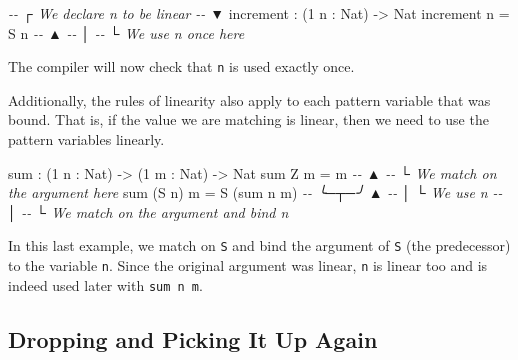 \documentclass[
]{article}
\newenvironment{Shaded}{}{}
\newcommand{\CommentTok}[1]{\textcolor[rgb]{0.38,0.63,0.69}{\textit{#1}}}
\newcommand{\DataTypeTok}[1]{\textcolor[rgb]{0.56,0.13,0.00}{#1}}
\newcommand{\DecValTok}[1]{\textcolor[rgb]{0.25,0.63,0.44}{#1}}
\newcommand{\FunctionTok}[1]{\textcolor[rgb]{0.02,0.16,0.49}{#1}}
\newcommand{\NormalTok}[1]{#1}
\newcommand{\OperatorTok}[1]{\textcolor[rgb]{0.40,0.40,0.40}{#1}}
\newcommand{\OtherTok}[1]{\textcolor[rgb]{0.00,0.44,0.13}{#1}}
\begin{document}
\begin{Shaded}
\begin{Highlighting}[]
\CommentTok{{-}{-}           ┌ We declare \textasciigrave{}n\textasciigrave{} to be linear}
\CommentTok{{-}{-}           ▼}
\NormalTok{increment }\OperatorTok{:}\NormalTok{ (}\DecValTok{1}\NormalTok{ n }\OperatorTok{:} \DataTypeTok{Nat}\NormalTok{) }\OtherTok{{-}\textgreater{}} \DataTypeTok{Nat}
\NormalTok{increment n }\OtherTok{=} \DataTypeTok{S}\NormalTok{ n}
\CommentTok{{-}{-}              ▲}
\CommentTok{{-}{-}              │}
\CommentTok{{-}{-}              └ We use n once here}
\end{Highlighting}
\end{Shaded}

The compiler will now check that \texttt{n} is used exactly once.

Additionally, the rules of linearity also apply to each pattern variable
that was bound. That is, if the value we are matching is linear, then we
need to use the pattern variables linearly.

\begin{Shaded}
\begin{Highlighting}[]
\FunctionTok{sum} \OperatorTok{:}\NormalTok{ (}\DecValTok{1}\NormalTok{ n }\OperatorTok{:} \DataTypeTok{Nat}\NormalTok{) }\OtherTok{{-}\textgreater{}}\NormalTok{ (}\DecValTok{1}\NormalTok{ m }\OperatorTok{:} \DataTypeTok{Nat}\NormalTok{) }\OtherTok{{-}\textgreater{}} \DataTypeTok{Nat}
\FunctionTok{sum} \DataTypeTok{Z}\NormalTok{ m }\OtherTok{=}\NormalTok{ m}
\CommentTok{{-}{-}  ▲}
\CommentTok{{-}{-}  └ We match on the argument here}
\FunctionTok{sum}\NormalTok{ (}\DataTypeTok{S}\NormalTok{ n) m }\OtherTok{=} \DataTypeTok{S}\NormalTok{ (}\FunctionTok{sum}\NormalTok{ n m)}
\CommentTok{{-}{-}  ╰─┬─╯            ▲}
\CommentTok{{-}{-}    │              └ We use \textasciigrave{}n\textasciigrave{}}
\CommentTok{{-}{-}    │}
\CommentTok{{-}{-}    └ We match on the argument and bind \textasciigrave{}n\textasciigrave{}}
\end{Highlighting}
\end{Shaded}

In this last example, we match on \texttt{S} and bind the argument of
\texttt{S} (the predecessor) to the variable \texttt{n}. Since the
original argument was linear, \texttt{n} is linear too and is indeed
used later with \texttt{sum\ n\ m}.

\hypertarget{dropping-and-picking-it-up-again}{%
\subsection{Dropping and Picking It Up
Again}\label{dropping-and-picking-it-up-again}}
\end{document}
